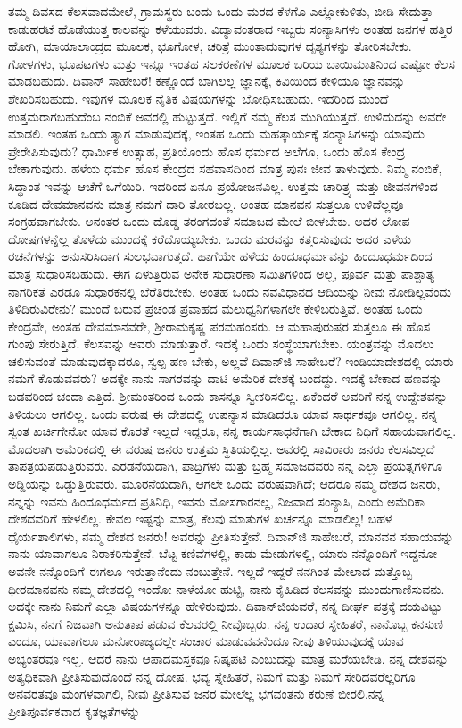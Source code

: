 ತಮ್ಮ ದಿವಸದ ಕೆಲಸವಾದಮೇಲೆ, ಗ್ರಾಮಸ್ಥರು ಬಂದು ಒಂದು ಮರದ ಕೆಳಗೊ ಎಲ್ಲೋಕುಳಿತು, ಬೀಡಿ ಸೇದುತ್ತಾ ಕಾಡುಹರಟೆ ಹೊಡೆಯುತ್ತ ಕಾಲವನ್ನು ಕಳೆಯುವರು. ವಿದ್ಯಾವಂತರಾದ ಇಬ್ಬರು ಸಂನ್ಯಾಸಿಗಳು ಅಂತಹ ಜನಗಳ ಹತ್ತಿರ ಹೋಗಿ, ಮಾಯಾಲಾಂದ್ರದ ಮೂಲಕ, ಭೂಗೋಳ, ಚರಿತ್ರೆ ಮುಂತಾದುವುಗಳ ದೃಶ್ಯಗಳನ್ನು ತೋರಿಸಬೇಕು. ಗೋಳಗಳು, ಭೂಪಟಗಳು ಮತ್ತು ಇನ್ನೂ ಇಂತಹ ಸಲಕರಣೆಗಳ ಮೂಲಕ ಬರಿಯ ಬಾಯಿಮಾತಿನಿಂದ ಎಷ್ಟೋ ಕೆಲಸ ಮಾಡಬಹುದು. ದಿವಾನ್ ಸಾಹೇಬರೆ! ಕಣ್ಣೊಂದೆ ಬಾಗಿಲಲ್ಲ ಜ್ಞಾನಕ್ಕೆ, ಕಿವಿಯಿಂದ ಕೇಳಿಯೂ ಜ್ಞಾನವನ್ನು ಶೇಖರಿಸಬಹುದು. ಇವುಗಳ ಮೂಲಕ ನೈತಿಕ ವಿಷಯಗಳನ್ನು ಬೋಧಿಸಬಹುದು. ಇದರಿಂದ ಮುಂದೆ ಉತ್ತಮರಾಗಬಹುದೆಂಬ ನಂಬಿಕೆ ಅವರಲ್ಲಿ ಹುಟ್ಟುತ್ತದೆ. ಇಲ್ಲಿಗೆ ನಮ್ಮ ಕೆಲಸ ಮುಗಿಯುತ್ತದೆ. ಉಳಿದುದನ್ನು ಅವರೇ ಮಾಡಲಿ. ಇಂತಹ ಒಂದು ತ್ಯಾಗ ಮಾಡುವುದಕ್ಕೆ, ಇಂತಹ ಒಂದು ಮಹತ್ಕಾರ್ಯಕ್ಕೆ ಸಂನ್ಯಾಸಿಗಳನ್ನು ಯಾವುದು ಪ್ರೇರೇಪಿಸುವುದು? ಧಾರ್ಮಿಕ ಉತ್ಸಾಹ, ಪ್ರತಿಯೊಂದು ಹೊಸ ಧರ್ಮದ ಅಲೆಗೂ, ಒಂದು ಹೊಸ ಕೇಂದ್ರ ಬೇಕಾಗುವುದು. ಹಳೆಯ ಧರ್ಮ ಹೊಸ ಕೇಂದ್ರದ ಸಹವಾಸದಿಂದ ಮಾತ್ರ ಪುನಃ ಜೀವ ತಾಳುವುದು. ನಿಮ್ಮ ನಂಬಿಕೆ, ಸಿದ್ಧಾಂತ ಇವನ್ನು ಆಚೆಗೆ ಒಗೆಯಿರಿ. ಇದರಿಂದ ಏನೂ ಪ್ರಯೋಜನವಿಲ್ಲ. ಉತ್ತಮ ಚಾರಿತ್ರ್ಯ ಮತ್ತು ಜೀವನಗಳಿಂದ ಕೂಡಿದ ದೇವಮಾನವನು ಮಾತ್ರ ನಮಗೆ ದಾರಿ ತೋರಬಲ್ಲ. ಅಂತಹ ಮಾನವನ ಸುತ್ತಲೂ ಉಳಿದೆಲ್ಲವೂ ಸಂಗ್ರಹವಾಗಬೇಕು. ಅನಂತರ ಒಂದು ದೊಡ್ಡ ತರಂಗದಂತೆ ಸಮಾಜದ ಮೇಲೆ ಬೀಳಬೇಕು. ಅದರ ಲೋಪ ದೋಷಗಳನ್ನೆಲ್ಲ ತೊಳೆದು ಮುಂದಕ್ಕೆ ಕರೆದೊಯ್ಯಬೇಕು. ಒಂದು ಮರವನ್ನು ಕತ್ತರಿಸುವುದು ಅದರ ಎಳೆಯ ರಚನೆಗಳನ್ನು ಅನುಸರಿಸಿದಾಗ ಸುಲಭವಾಗುತ್ತದೆ. ಹಾಗೆಯೇ ಹಳೆಯ ಹಿಂದೂಧರ್ಮವನ್ನು ಹಿಂದೂಧರ್ಮದಿಂದ ಮಾತ್ರ ಸುಧಾರಿಸಬಹುದು. ಈಗ ಏಳುತ್ತಿರುವ ಅನೇಕ ಸುಧಾರಣಾ ಸಮಿತಿಗಳಿಂದ ಅಲ್ಲ, ಪೂರ್ವ ಮತ್ತು ಪಾಶ್ಚಾತ್ಯ ನಾಗರಿಕತೆ ಎರಡೂ ಸುಧಾರಕನಲ್ಲಿ ಬೆರೆತಿರಬೇಕು. ಅಂತಹ ಒಂದು ನವವಿಧಾನದ ಆದಿಯನ್ನು ನೀವು ನೋಡಿಲ್ಲವೆಂದು ತಿಳಿದಿರುವಿರೇನು? ಮುಂದೆ ಬರುವ ಪ್ರಚಂಡ ಪ್ರವಾಹದ ಮೆಲುಧ್ವನಿಗಳಾಗಲೇ ಕೇಳಿಬರುತ್ತಿವೆ. ಅಂತಹ ಒಂದು ಕೇಂದ್ರವೇ, ಅಂತಹ ದೇವಮಾನವರೇ, ಶ‍್ರೀರಾಮಕೃಷ್ಣ ಪರಮಹಂಸರು. ಆ ಮಹಾಪುರುಷರ ಸುತ್ತಲೂ ಈ ಹೊಸ ಗುಂಪು ಸೇರುತ್ತಿದೆ. ಕೆಲಸವನ್ನು ಅವರು ಮಾಡುತ್ತಾರೆ. ಇದಕ್ಕೆ ಒಂದು ಸಂಸ್ಥೆಯಾಗಬೇಕು. ಯಂತ್ರವನ್ನು ಮೊದಲು ಚಲಿಸುವಂತೆ ಮಾಡುವುದಕ್ಕಾದರೂ, ಸ್ವಲ್ಪ ಹಣ ಬೇಕು, ಅಲ್ಲವೆ ದಿವಾನ್‌ಜಿ ಸಾಹೇಬರೆ? ಇಂಡಿಯಾದೇಶದಲ್ಲಿ ಯಾರು ನಮಗೆ ಕೊಡುವವರು? ಅದಕ್ಕೇ ನಾನು ಸಾಗರವನ್ನು ದಾಟಿ ಅಮೆರಿಕ ದೇಶಕ್ಕೆ ಬಂದದ್ದು. ಇದಕ್ಕೆ ಬೇಕಾದ ಹಣವನ್ನು ಬಡವರಿಂದ ಚಂದಾ ಎತ್ತಿದೆ. ಶ‍್ರೀಮಂತರಿಂದ ಒಂದು ಕಾಸನ್ನೂ ಸ್ವೀಕರಿಸಲಿಲ್ಲ. ಏಕೆಂದರೆ ಅವರಿಗೆ ನನ್ನ ಉದ್ದೇಶವನ್ನು ತಿಳಿಯಲು ಆಗಲಿಲ್ಲ. ಒಂದು ವರುಷ ಈ ದೇಶದಲ್ಲಿ ಉಪನ್ಯಾಸ ಮಾಡಿದರೂ ಯಾವ ಸಾರ್ಥಕವೂ ಆಗಲಿಲ್ಲ. ನನ್ನ ಸ್ವಂತ ಖರ್ಚಿಗೇನೋ ಯಾವ ಕೊರತೆ ಇಲ್ಲದೆ ಇದ್ದರೂ, ನನ್ನ ಕಾರ್ಯಸಾಧನೆಗಾಗಿ ಬೇಕಾದ ನಿಧಿಗೆ ಸಹಾಯವಾಗಲಿಲ್ಲ. ಮೊದಲಾಗಿ ಅಮೆರಿಕದಲ್ಲಿ ಈ ವರುಷ ಜನರು ಉತ್ತಮ ಸ್ಥಿತಿಯಲ್ಲಿಲ್ಲ. ಅವರಲ್ಲಿ ಸಾವಿರಾರು ಜನರು ಕೆಲಸವಿಲ್ಲದೆ ತಾಪತ್ರಯಪಡುತ್ತಿರುವರು. ಎರಡನೆಯದಾಗಿ, ಪಾದ್ರಿಗಳು ಮತ್ತು ಬ್ರಹ್ಮ ಸಮಾಜದವರು ನನ್ನ ಎಲ್ಲಾ ಪ್ರಯತ್ನಗಳಿಗೂ ಅಡ್ಡಿಯನ್ನು ಒಡ್ಡುತ್ತಿರುವರು. ಮೂರನೆಯದಾಗಿ, ಆಗಲೇ ಒಂದು ವರುಷವಾಗಿದೆ; ಆದರೂ ನಮ್ಮ ದೇಶದ ಜನರು, ನನ್ನನ್ನು ಇವನು ಹಿಂದೂಧರ್ಮದ ಪ್ರತಿನಿಧಿ, ಇವನು ಮೋಸಗಾರನಲ್ಲ, ನಿಜವಾದ ಸಂನ್ಯಾಸಿ, ಎಂದು ಅಮೆರಿಕಾ ದೇಶದವರಿಗೆ ಹೇಳಲಿಲ್ಲ. ಕೇವಲ ಇಷ್ಟನ್ನು ಮಾತ್ರ, ಕೆಲವು ಮಾತುಗಳ ಖರ್ಚನ್ನೂ ಮಾಡಲಿಲ್ಲ! ಬಹಳ ಧೈರ್ಯಶಾಲಿಗಳು, ನಮ್ಮ ದೇಶದ ಜನರು! ಅವರನ್ನು ಪ್ರೀತಿಸುತ್ತೇನೆ. ದಿವಾನ್‌ಜಿ ಸಾಹೇಬರೆ, ಮಾನವನ ಸಹಾಯವನ್ನು ನಾನು ಯಾವಾಗಲೂ ನಿರಾಕರಿಸುತ್ತೇನೆ. ಬೆಟ್ಟ ಕಣಿವೆಗಳಲ್ಲಿ, ಕಾಡು ಮೇಡುಗಳಲ್ಲಿ, ಯಾರು ನನ್ನೊಂದಿಗೆ ಇದ್ದನೋ ಅವನೇ ನನ್ನೊಂದಿಗೆ ಈಗಲೂ ಇರುತ್ತಾನೆಂದು ನಂಬುತ್ತೇನೆ. ಇಲ್ಲದೆ ಇದ್ದರೆ ನನಗಿಂತ ಮೇಲಾದ ಮತ್ತೊಬ್ಬ ಧೀರಮಾನವನು ನಮ್ಮ ದೇಶದಲ್ಲಿ ಇಂದೋ ನಾಳೆಯೋ ಹುಟ್ಟಿ, ನಾನು ಕೈಹಿಡಿದ ಕೆಲಸವನ್ನು ಮುಂದುಗಾಣಿಸುವನು. ಅದಕ್ಕೇ ನಾನು ನಿಮಗೆ ಎಲ್ಲಾ ವಿಷಯಗಳನ್ನೂ ಹೇಳಿರುವುದು. ದಿವಾನ್‌ಜಿಯವರೆ, ನನ್ನ ದೀರ್ಘ ಪತ್ರಕ್ಕೆ ದಯವಿಟ್ಟು ಕ್ಷಮಿಸಿ, ನನಗೆ ನಿಜವಾಗಿ ಅನುತಾಪ ಪಡುವ ಕೆಲವರಲ್ಲಿ ನೀವೊಬ್ಬರು. ನನ್ನ ಉದಾರ ಸ್ನೇಹಿತರೆ, ನಾನೊಬ್ಬ ಕನಸುಣಿ ಎಂದೂ, ಯಾವಾಗಲೂ ಮನೋರಾಜ್ಯದಲ್ಲೇ ಸಂಚಾರ ಮಾಡುವವನೆಂದೂ ನೀವು ತಿಳಿಯುವುದಕ್ಕೆ ಯಾವ ಅಭ್ಯಂತರವೂ ಇಲ್ಲ. ಆದರೆ ನಾನು ಆಪಾದಮಸ್ತಕವೂ ನಿಷ್ಕಪಟಿ ಎಂಬುದನ್ನು ಮಾತ್ರ ಮರೆಯಬೇಡಿ. ನನ್ನ ದೇಶವನ್ನು ಅತ್ಯಧಿಕವಾಗಿ ಪ್ರೀತಿಸುವುದೊಂದೆ ನನ್ನ ದೋಷ. ಭವ್ಯ ಸ್ನೇಹಿತರೆ, ನಿಮಗೆ ಮತ್ತು ನಿಮಗೆ ಸೇರಿದವರೆಲ್ಲರಿಗೂ ಅನವರತವೂ ಮಂಗಳವಾಗಲಿ, ನೀವು ಪ್ರೀತಿಸುವ ಜನರ ಮೇಲೆಲ್ಲ ಭಗವಂತನು ಕರುಣೆ ಬೀರಲಿ.ನನ್ನ ಪ್ರೀತಿಪೂರ್ವಕವಾದ ಕೃತಜ್ಞತೆಗಳನ್ನು 